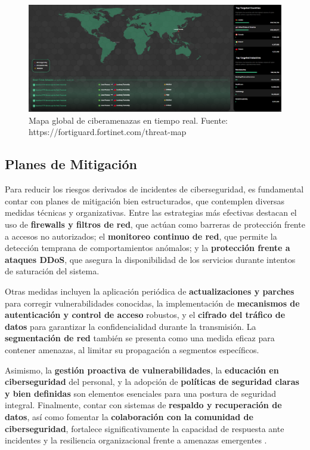 \documentclass[a4paper, 10pt]{article}
\begin{document}
\begin{figure}[H]
    \centering
    \includegraphics[width=\textwidth]{images/mapa.png}
    \caption{Mapa global de ciberamenazas en tiempo real. Fuente: https://fortiguard.fortinet.com/threat-map}
    \label{fig:mapa-fortiguard}
\end{figure}

\subsection{Planes de Mitigación}

Para reducir los riesgos derivados de incidentes de ciberseguridad, es fundamental contar con planes de mitigación bien estructurados, 
que contemplen diversas medidas técnicas y organizativas. 
Entre las estrategias más efectivas destacan el uso de \textbf{firewalls y filtros de red}, que actúan como barreras de 
protección frente a accesos no autorizados; el \textbf{monitoreo continuo de red}, que permite la detección temprana de comportamientos anómalos; 
y la \textbf{protección frente a ataques DDoS}, que asegura la disponibilidad de los servicios durante intentos de saturación del sistema.

\par\vspace{0.5cm}

Otras medidas incluyen la aplicación periódica de \textbf{actualizaciones y parches} para corregir vulnerabilidades conocidas, 
la implementación de \textbf{mecanismos de autenticación y control de acceso} robustos, y el \textbf{cifrado del tráfico de datos} para garantizar la confidencialidad 
durante la transmisión. La \textbf{segmentación de red} también se presenta como una medida eficaz para contener amenazas, al limitar su propagación a segmentos específicos.
\par\vspace{0.5cm}

Asimismo, la \textbf{gestión proactiva de vulnerabilidades}, la \textbf{educación en ciberseguridad} del personal, y la adopción de \textbf{políticas de seguridad claras y bien definidas} son elementos esenciales para una postura de seguridad integral. Finalmente, contar con sistemas de \textbf{respaldo y recuperación de datos}, así como fomentar la \textbf{colaboración con la comunidad de ciberseguridad}, fortalece significativamente la capacidad de respuesta ante incidentes y la resiliencia organizacional frente a amenazas emergentes \cite{mitigacion}.
\end{document}
